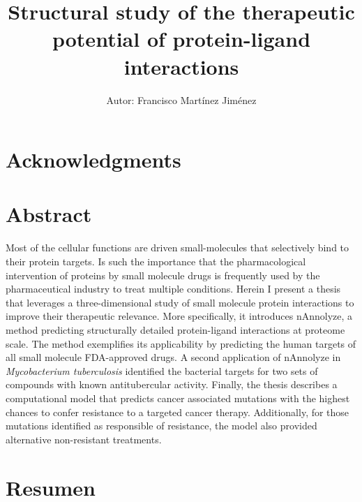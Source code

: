 \documentclass[11pt, b5paper,twoside]{tesi_upf}
\title{Structural study of the therapeutic potential of protein-ligand interactions}
\author{Autor: Francisco Mart\'inez Jim\'enez}
\begin{document}
\sloppy
\captionsetup[table]{skip=20pt}
\captionsetup[longtable]{skip=20pt}
\frontmatter
{}

\maketitle
\thispagestyle{empty}
\cleardoublepage
\thispagestyle{empty}



\clearpage
\section*{Acknowledgments}
\setcounter{page}{1}

\clearpage
\section*{Abstract}

Most of the cellular functions are driven small-molecules that selectively bind to their protein targets. Is such the importance that the pharmacological intervention of proteins by small molecule drugs is frequently used by the pharmaceutical industry to treat multiple conditions. Herein I present a thesis that leverages a three-dimensional study of small molecule protein interactions to improve their therapeutic relevance. More specifically, it introduces nAnnolyze, a method predicting structurally detailed protein-ligand interactions at proteome scale. The method exemplifies its applicability by predicting the human targets of all small molecule FDA-approved drugs. A second application of nAnnolyze in \textit{Mycobacterium tuberculosis} identified the bacterial targets for two sets of compounds with known antitubercular activity. Finally, the thesis describes a computational model that predicts cancer associated mutations with the highest chances to confer resistance to a targeted cancer therapy. Additionally, for those mutations identified as responsible of resistance, the model also provided alternative non-resistant treatments. 

\vspace*{\fill}

\section*{Resumen}
\end{document}

